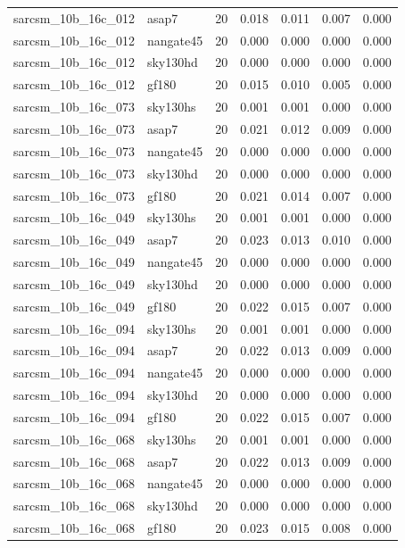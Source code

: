 \begin{tabular}{llrrrrr}
sarcsm\_10b\_16c\_012 & asap7 & 20 & 0.018 & 0.011 & 0.007 & 0.000 \\
sarcsm\_10b\_16c\_012 & nangate45 & 20 & 0.000 & 0.000 & 0.000 & 0.000 \\
sarcsm\_10b\_16c\_012 & sky130hd & 20 & 0.000 & 0.000 & 0.000 & 0.000 \\
sarcsm\_10b\_16c\_012 & gf180 & 20 & 0.015 & 0.010 & 0.005 & 0.000 \\
sarcsm\_10b\_16c\_073 & sky130hs & 20 & 0.001 & 0.001 & 0.000 & 0.000 \\
sarcsm\_10b\_16c\_073 & asap7 & 20 & 0.021 & 0.012 & 0.009 & 0.000 \\
sarcsm\_10b\_16c\_073 & nangate45 & 20 & 0.000 & 0.000 & 0.000 & 0.000 \\
sarcsm\_10b\_16c\_073 & sky130hd & 20 & 0.000 & 0.000 & 0.000 & 0.000 \\
sarcsm\_10b\_16c\_073 & gf180 & 20 & 0.021 & 0.014 & 0.007 & 0.000 \\
sarcsm\_10b\_16c\_049 & sky130hs & 20 & 0.001 & 0.001 & 0.000 & 0.000 \\
sarcsm\_10b\_16c\_049 & asap7 & 20 & 0.023 & 0.013 & 0.010 & 0.000 \\
sarcsm\_10b\_16c\_049 & nangate45 & 20 & 0.000 & 0.000 & 0.000 & 0.000 \\
sarcsm\_10b\_16c\_049 & sky130hd & 20 & 0.000 & 0.000 & 0.000 & 0.000 \\
sarcsm\_10b\_16c\_049 & gf180 & 20 & 0.022 & 0.015 & 0.007 & 0.000 \\
sarcsm\_10b\_16c\_094 & sky130hs & 20 & 0.001 & 0.001 & 0.000 & 0.000 \\
sarcsm\_10b\_16c\_094 & asap7 & 20 & 0.022 & 0.013 & 0.009 & 0.000 \\
sarcsm\_10b\_16c\_094 & nangate45 & 20 & 0.000 & 0.000 & 0.000 & 0.000 \\
sarcsm\_10b\_16c\_094 & sky130hd & 20 & 0.000 & 0.000 & 0.000 & 0.000 \\
sarcsm\_10b\_16c\_094 & gf180 & 20 & 0.022 & 0.015 & 0.007 & 0.000 \\
sarcsm\_10b\_16c\_068 & sky130hs & 20 & 0.001 & 0.001 & 0.000 & 0.000 \\
sarcsm\_10b\_16c\_068 & asap7 & 20 & 0.022 & 0.013 & 0.009 & 0.000 \\
sarcsm\_10b\_16c\_068 & nangate45 & 20 & 0.000 & 0.000 & 0.000 & 0.000 \\
sarcsm\_10b\_16c\_068 & sky130hd & 20 & 0.000 & 0.000 & 0.000 & 0.000 \\
sarcsm\_10b\_16c\_068 & gf180 & 20 & 0.023 & 0.015 & 0.008 & 0.000 \\

\end{tabular}

